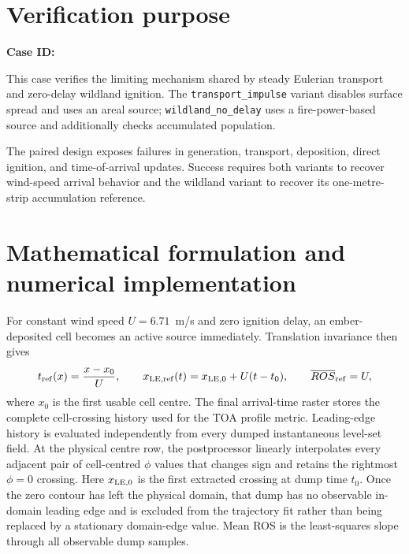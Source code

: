 \section{Verification purpose}

\textbf{Case ID:} \CaseID

This case verifies the limiting mechanism shared by steady Eulerian transport and zero-delay wildland ignition. The \texttt{transport\_impulse} variant disables surface spread and uses an areal source; \texttt{wildland\_no\_delay} uses a fire-power-based source and additionally checks accumulated population.

The paired design exposes failures in generation, transport, deposition, direct ignition, and time-of-arrival updates. Success requires both variants to recover wind-speed arrival behavior and the wildland variant to recover its one-metre-strip accumulation reference.

\section{Mathematical formulation and numerical implementation}
For constant wind speed $U=6.71$~m/s and zero ignition delay, an ember-deposited
cell becomes an active source immediately. Translation invariance then gives
\begin{equation}
 t_{\rm ref}(x)=\frac{x-x_0}{U},\qquad
 x_{\rm LE,ref}(t)=x_{\rm LE,0}+U(t-t_0),\qquad
 \overline{ROS}_{\rm ref}=U,
 \label{eq:transport}
\end{equation}
where $x_0$ is the first usable cell centre. The final arrival-time raster stores
the complete cell-crossing history used for the TOA profile metric. Leading-edge
history is evaluated independently from every dumped instantaneous level-set
field. At the physical centre row, the postprocessor linearly interpolates every
adjacent pair of cell-centred $\phi$ values that changes sign and retains the
rightmost $\phi=0$ crossing. Here $x_{\rm LE,0}$ is the first extracted crossing
at dump time $t_0$. Once the zero contour has left the physical domain, that dump
has no observable in-domain leading edge and is excluded from the trajectory fit
rather than being replaced by a stationary domain-edge value. Mean ROS is the
least-squares slope through all observable dump samples.

